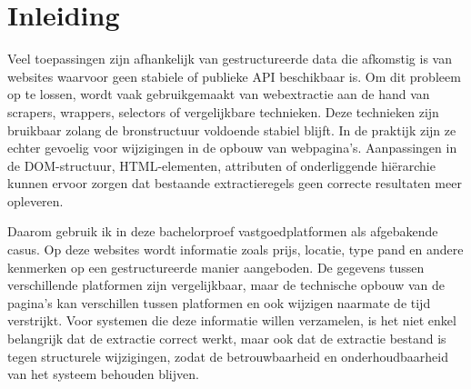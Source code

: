 



\section{Inleiding}
\label{sec:inleiding}
Veel toepassingen zijn afhankelijk van gestructureerde data die afkomstig is van websites waarvoor geen stabiele of publieke API beschikbaar is. Om dit probleem op te lossen, wordt vaak gebruikgemaakt van webextractie aan de hand van scrapers, wrappers, selectors of vergelijkbare technieken. Deze technieken zijn bruikbaar zolang de bronstructuur voldoende stabiel blijft. In de praktijk zijn ze echter gevoelig voor wijzigingen in de opbouw van webpagina’s. Aanpassingen in de DOM-structuur, HTML-elementen, attributen of onderliggende hiërarchie kunnen ervoor zorgen dat bestaande extractieregels geen correcte resultaten meer opleveren.

Daarom gebruik ik in deze bachelorproef vastgoedplatformen als afgebakende casus. Op deze websites wordt informatie zoals prijs, locatie, type pand en andere kenmerken op een gestructureerde manier aangeboden. De gegevens tussen verschillende platformen zijn vergelijkbaar, maar de technische opbouw van de pagina’s kan verschillen tussen platformen en ook wijzigen naarmate de tijd verstrijkt. Voor systemen die deze informatie willen verzamelen, is het niet enkel belangrijk dat de extractie correct werkt, maar ook dat de extractie bestand is tegen structurele wijzigingen, zodat de betrouwbaarheid en onderhoudbaarheid van het systeem behouden blijven.

